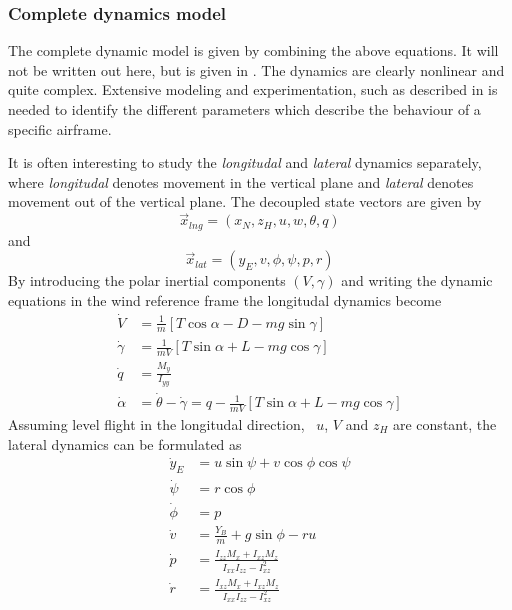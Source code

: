 \subsubsection{Complete dynamics model}
The complete dynamic model is given by combining the above equations. It will not be 
written out here, but is given in \eg \cite{uav_dynamics_wind}. The dynamics are clearly nonlinear and quite complex. Extensive modeling and experimentation, such as described in \cite{aerodynamic_parameters}
is needed to identify the different parameters which describe the behaviour of a specific airframe.

It is often interesting to study the \textit{longitudal} and \textit{lateral} dynamics
separately, where \textit{longitudal} denotes movement in the vertical plane and
\textit{lateral} denotes movement out of the vertical plane. The decoupled state
vectors are given by
\begin{equation}
    \vec{x}_{lng}=(x_N, z_H, u, w, \theta, q)
\end{equation}
and
\begin{equation}
    \vec{x}_{lat}=(y_E, v, \phi, \psi, p, r)
\end{equation}
By introducing the polar inertial components $(V, \gamma)$ and writing the dynamic equations
in the wind reference frame the longitudal dynamics become
\begin{align}
    \dot{V}&=\frac{1}{m}[T\cos\alpha-D-mg\sin\gamma] \\
    \dot{\gamma}&=\frac{1}{mV}[T\sin\alpha + L - mg\cos\gamma] \\
    \dot{q}&=\frac{M_y}{I_{yy}} \\
    \dot{\alpha}&=\dot{\theta}-\dot{\gamma}=q-\frac{1}{mV}[T\sin\alpha + L - mg\cos\gamma]
\end{align}
Assuming level flight in the longitudal direction, \ie\  $u$, $V$ and $z_H$ are constant, the lateral dynamics can be formulated as
\begin{align}
    \dot{y}_E &= u\sin\psi + v\cos\phi\cos\psi \\
    \dot{\psi} &= r\cos\phi \\
    \dot{\phi} &= p \\
    \dot{v} &= \frac{Y_B}{m} + g\sin\phi - ru \\
    \dot{p} &= \frac{I_{zz}M_x + I_{xz}M_z}{I_{xx}I_{zz} - I^2_{xz}} \\
    \dot{r} &= \frac{I_{xz}M_x + I_{xz}M_z}{I_{xx}I_{zz} - I^2_{xz}} \\
\end{align}